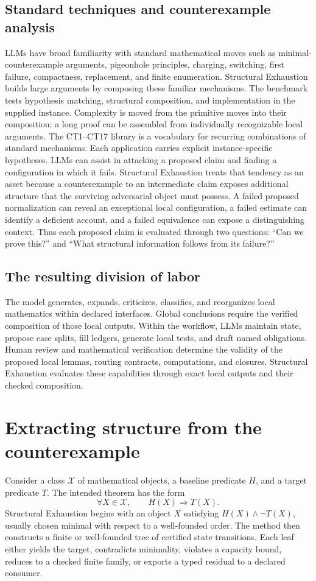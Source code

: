 \documentclass[11pt]{article}
\begin{document}
\subsection{Standard techniques and counterexample analysis}
LLMs have broad familiarity with standard mathematical moves such as minimal-counterexample arguments, pigeonhole principles, charging, switching, first failure, compactness, replacement, and finite enumeration.
Structural Exhaustion builds large arguments by composing these familiar mechanisms. The benchmark tests hypothesis matching, structural composition, and implementation in the supplied instance.
Complexity is moved from the primitive moves into their composition: a long proof can be assembled from individually recognizable local arguments.
The CT1–CT17 library is a vocabulary for recurring combinations of standard mechanisms. Each application carries explicit instance-specific hypotheses.
LLMs can assist in attacking a proposed claim and finding a configuration in which it fails.
Structural Exhaustion treats that tendency as an asset because a counterexample to an intermediate claim exposes additional structure that the surviving adversarial object must possess.
A failed proposed normalization can reveal an exceptional local configuration, a failed estimate can identify a deficient account, and a failed equivalence can expose a distinguishing context.
Thus each proposed claim is evaluated through two questions: “Can we prove this?” and “What structural information follows from its failure?”
\subsection{The resulting division of labor}
The model generates, expands, criticizes, classifies, and reorganizes local mathematics within declared interfaces. Global conclusions require the verified composition of those local outputs.
Within the workflow, LLMs maintain state, propose case splits, fill ledgers, generate local tests, and draft named obligations.
Human review and mathematical verification determine the validity of the proposed local lemmas, routing contracts, computations, and closures.
Structural Exhaustion evaluates these capabilities through exact local outputs and their checked composition.
\section{Extracting structure from the counterexample}
Consider a class \(\mathcal X\) of mathematical objects, a baseline predicate
\(H\), and a target predicate \(T\). The intended theorem has the form
\[
  \forall X\in\mathcal X,\qquad H(X)\Longrightarrow T(X).
\]
Structural Exhaustion begins with an object \(X\) satisfying
\(H(X)\wedge\neg T(X)\), usually chosen minimal with respect to a well-founded
order. The method then constructs a finite or well-founded tree of certified
state transitions. Each leaf either yields the target, contradicts minimality,
violates a capacity bound, reduces to a checked finite family, or exports a
typed residual to a declared consumer.
\end{document}

